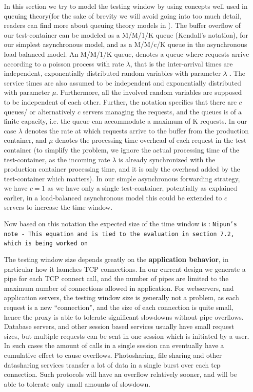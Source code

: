 In this section we try to model the testing window by using concepts well used in queuing theory(for the sake of brevity we will avoid going into too much detail, readers can find more about queuing theory models in \cite{queueWiki}).
The buffer overflow of our test-container can be modeled as a M/M/1/K queue (Kendall's notation\cite{kendall}), for our simplest asynchronous model, and as a M/M/c/K queue in the asynchronous load-balanced model.
An M/M/1/K queue, denotes a queue where requests arrive according to a poisson process with rate $\lambda$, that is the inter-arrival times are independent, exponentially distributed random variables with parameter $\lambda$ . 
The service times are also assumed to be independent and exponentially distributed with parameter $\mu$. Furthermore, all the involved random variables are supposed to be independent of each other. 
Further, the notation specifies that there are $c$ queues/ or alternatively $c$ servers managing the requests, and the queues is of a finite capacity, i.e. the queue can accommodate a maximum of K requests.
In our case $\lambda$ denotes the rate at which requests arrive to the buffer from the production container, and $\mu$ denotes the processing time overhead of each request in the test-container (to simplify the problem, we ignore the actual processing time of the test-container, as the incoming rate $\lambda$ is already synchronized with the production container processing time, and it is only the overhead added by the test-container which matters). 
In our simple asynchronous forwarding strategy, we have $c=1$ as we have only a single test-container, potentially as explained earlier, in a load-balanced asynchronous model this could be extended to $c$ servers to increase the time window.

Now based on this notation the expected size of the time window is :
\texttt{Nipun's note - This equation and is tied to the evaluation in section 7.2, which is being worked on}

The testing window size depends greatly on the \textbf{application behavior}, in particular how it launches TCP connections. 
In our current design we generate a pipe for each TCP connect call, and the number of pipes are limited to the maximum number of connections allowed in application.
For webservers, and application servers, the testing window size is generally not a problem, as each request is a new ``connection'', and the size of each connection is quite small, hence the proxy is able to tolerate significant slowdowns without pipe overflows.
Database servers, and other session based services usually have small request sizes, but multiple requests can be sent in one session which is initiated by a user. In such cases the amount of calls in a single session can eventually have a cumulative effect to cause overflows.
Photosharing, file sharing and other datasharing services transfer a lot of data in a single burst over each tcp connection. Such protocols will have an overflow relatively sooner, and will be able to tolerate only small amounts of slowdown. 

